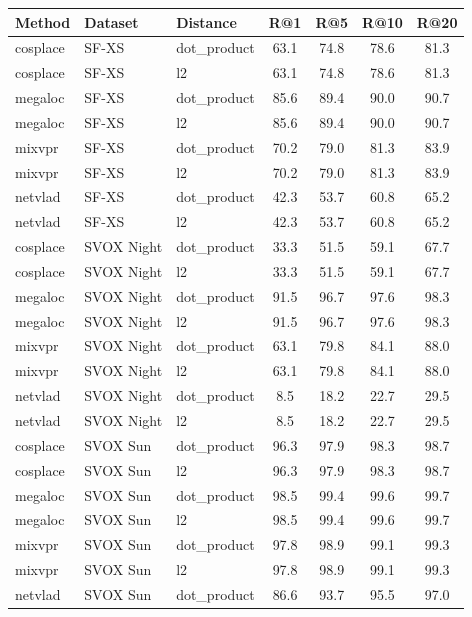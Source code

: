 \begin{table}[h]
\centering
\begin{tabular}{l|l|l|c|c|c|c}
\hline
Method & Dataset & Distance & R@1 & R@5 & R@10 & R@20 \\
\hline
cosplace & SF-XS & dot\_product & 63.1 & 74.8 & 78.6 & 81.3 \\
cosplace & SF-XS & l2 & 63.1 & 74.8 & 78.6 & 81.3 \\
megaloc & SF-XS & dot\_product & 85.6 & 89.4 & 90.0 & 90.7 \\
megaloc & SF-XS & l2 & 85.6 & 89.4 & 90.0 & 90.7 \\
mixvpr & SF-XS & dot\_product & 70.2 & 79.0 & 81.3 & 83.9 \\
mixvpr & SF-XS & l2 & 70.2 & 79.0 & 81.3 & 83.9 \\
netvlad & SF-XS & dot\_product & 42.3 & 53.7 & 60.8 & 65.2 \\
netvlad & SF-XS & l2 & 42.3 & 53.7 & 60.8 & 65.2 \\
\hline
cosplace & SVOX Night & dot\_product & 33.3 & 51.5 & 59.1 & 67.7 \\
cosplace & SVOX Night & l2 & 33.3 & 51.5 & 59.1 & 67.7 \\
megaloc & SVOX Night & dot\_product & 91.5 & 96.7 & 97.6 & 98.3 \\
megaloc & SVOX Night & l2 & 91.5 & 96.7 & 97.6 & 98.3 \\
mixvpr & SVOX Night & dot\_product & 63.1 & 79.8 & 84.1 & 88.0 \\
mixvpr & SVOX Night & l2 & 63.1 & 79.8 & 84.1 & 88.0 \\
netvlad & SVOX Night & dot\_product & 8.5 & 18.2 & 22.7 & 29.5 \\
netvlad & SVOX Night & l2 & 8.5 & 18.2 & 22.7 & 29.5 \\
\hline
cosplace & SVOX Sun & dot\_product & 96.3 & 97.9 & 98.3 & 98.7 \\
cosplace & SVOX Sun & l2 & 96.3 & 97.9 & 98.3 & 98.7 \\
megaloc & SVOX Sun & dot\_product & 98.5 & 99.4 & 99.6 & 99.7 \\
megaloc & SVOX Sun & l2 & 98.5 & 99.4 & 99.6 & 99.7 \\
mixvpr & SVOX Sun & dot\_product & 97.8 & 98.9 & 99.1 & 99.3 \\
mixvpr & SVOX Sun & l2 & 97.8 & 98.9 & 99.1 & 99.3 \\
netvlad & SVOX Sun & dot\_product & 86.6 & 93.7 & 95.5 & 97.0 \\

\end{tabular}
\end{table}
